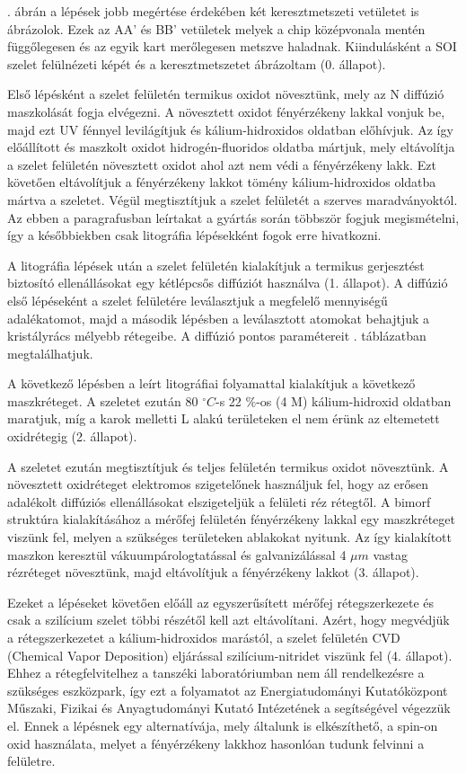 . ábrán a lépések jobb megértése érdekében két keresztmetszeti vetületet is ábrázolok. Ezek az AA' és BB' vetületek melyek a chip középvonala mentén függőlegesen és az egyik kart merőlegesen metszve haladnak. Kiindulásként a SOI szelet felülnézeti képét és a keresztmetszetet ábrázoltam (0. állapot).

Első lépésként a szelet felületén termikus oxidot növesztünk, mely az N diffúzió maszkolását fogja elvégezni. A növesztett oxidot fényérzékeny lakkal vonjuk be, majd ezt UV fénnyel levilágítjuk és kálium-hidroxidos oldatban előhívjuk. Az így előállított és maszkolt oxidot hidrogén-fluoridos oldatba mártjuk, mely eltávolítja a szelet felületén növesztett oxidot ahol azt nem védi a fényérzékeny lakk. Ezt követően eltávolítjuk a fényérzékeny lakkot tömény kálium-hidroxidos oldatba mártva a szeletet. Végül megtisztítjuk a szelet felületét a szerves maradványoktól. Az ebben a paragrafusban leírtakat a gyártás során többször fogjuk megismételni, így a későbbiekben csak litográfia lépésekként fogok erre hivatkozni.

A litográfia lépések után a szelet felületén kialakítjuk a termikus gerjesztést biztosító ellenállásokat egy kétlépcsős diffúziót használva (1. állapot). A diffúzió első lépéseként a szelet felületére leválasztjuk a megfelelő mennyiségű adalékatomot, majd a második lépésben a leválasztott atomokat behajtjuk a kristályrács mélyebb rétegeibe. A diffúzió pontos paramétereit . táblázatban megtalálhatjuk.

A következő lépésben a leírt litográfiai folyamattal kialakítjuk a következő maszkréteget. A szeletet ezután 80 $^\circ C$-s 22 $\%$-os (4 M) kálium-hidroxid oldatban maratjuk\cite{KOH_etch}, míg a karok melletti L alakú területeken el nem érünk az eltemetett oxidrétegig (2. állapot).

A szeletet ezután megtisztítjuk és teljes felületén termikus oxidot növesztünk. A növesztett oxidréteget elektromos szigetelőnek használjuk fel, hogy az erősen adalékolt diffúziós ellenállásokat elszigeteljük a felületi réz rétegtől. A bimorf struktúra kialakításához a mérőfej felületén fényérzékeny lakkal egy maszkréteget viszünk fel, melyen a szükséges területeken ablakokat nyitunk. Az így kialakított maszkon keresztül vákuumpárologtatással és galvanizálással 4 $\mu m$ vastag rézréteget növesztünk, majd eltávolítjuk a fényérzékeny lakkot (3. állapot).

Ezeket a lépéseket követően előáll az egyszerűsített mérőfej rétegszerkezete és csak a szilícium szelet többi részétől kell azt eltávolítani. Azért, hogy megvédjük a rétegszerkezetet a kálium-hidroxidos marástól, a szelet felületén CVD (Chemical Vapor Deposition) eljárással szilícium-nitridet viszünk fel (4. állapot). Ehhez a rétegfelvitelhez a tanszéki laboratóriumban nem áll rendelkezésre a szükséges eszközpark, így ezt a folyamatot az Energiatudományi Kutatóközpont Műszaki, Fizikai és Anyagtudományi Kutató Intézetének a segítségével végezzük el. Ennek a lépésnek egy alternatívája, mely általunk is elkészíthető, a spin-on oxid használata, melyet a fényérzékeny lakkhoz hasonlóan tudunk felvinni a felületre.

